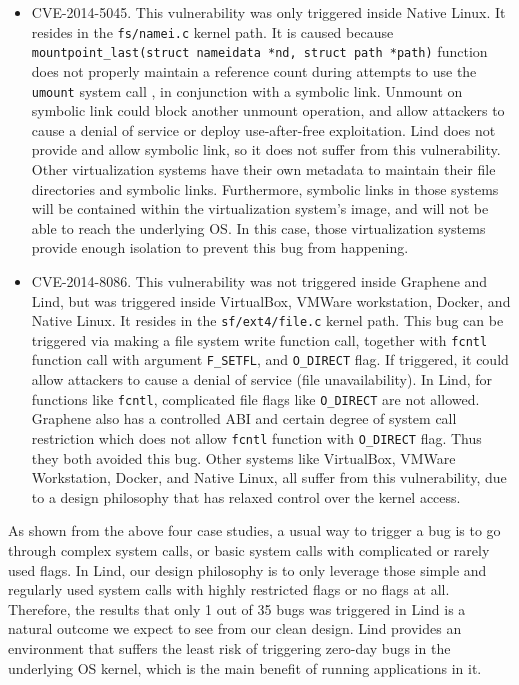 \begin{itemize}
\item CVE-2014-5045. This vulnerability was only triggered inside Native Linux. It resides in the 
\texttt{fs/namei.c} kernel path. It is caused because 
\texttt{mountpoint\_last(struct nameidata *nd, struct path *path)} function does not properly 
maintain a reference count during attempts to use the \texttt{umount} system call 
, in conjunction with a symbolic link. Unmount on symbolic link could block another unmount operation, 
and allow attackers to cause a denial of service or deploy use-after-free exploitation. 
Lind does not provide and allow symbolic link, so it does not suffer from this vulnerability. 
Other virtualization systems have their own metadata to maintain their file directories and symbolic links. 
Furthermore, symbolic links in those systems will be contained within the virtualization system's image, 
and will not be able to reach the underlying OS. In this case, those virtualization systems provide enough 
isolation to prevent this bug from happening. 

\item CVE-2014-8086. This vulnerability was not triggered inside Graphene and Lind, but was triggered inside 
VirtualBox, VMWare workstation, Docker, and Native Linux. It resides in the \texttt{sf/ext4/file.c} kernel path. 
This bug can be triggered via making a file system write function call, together with \texttt{fcntl} function call 
with argument \texttt{F\_SETFL}, and \texttt{O\_DIRECT} flag. If triggered, it could allow attackers to cause 
a denial of service (file unavailability). In Lind,  for functions like \texttt{fcntl}, complicated 
file flags like \texttt{O\_DIRECT} are not allowed. Graphene also has a controlled ABI and certain degree of 
system call restriction which does not allow \texttt{fcntl} function with \texttt{O\_DIRECT} flag. 
Thus they both avoided this bug. Other systems like VirtualBox, VMWare Workstation, Docker, and Native Linux, 
all suffer from this vulnerability, due to a design philosophy that has relaxed control over the kernel access. 

\end{itemize}

As shown from the above four case studies, a usual way to trigger a bug is to go through complex system calls, 
or basic system calls with complicated or rarely used flags. In Lind, our design philosophy is to only leverage those 
simple and regularly used system calls with highly restricted flags or no flags at all. Therefore, the results that only 
1 out of 35 bugs was triggered in Lind is a natural outcome we expect to see from our clean design. Lind provides 
an environment that suffers the least risk of triggering zero-day bugs in the underlying OS kernel, 
which is the main benefit of running applications in it.  

